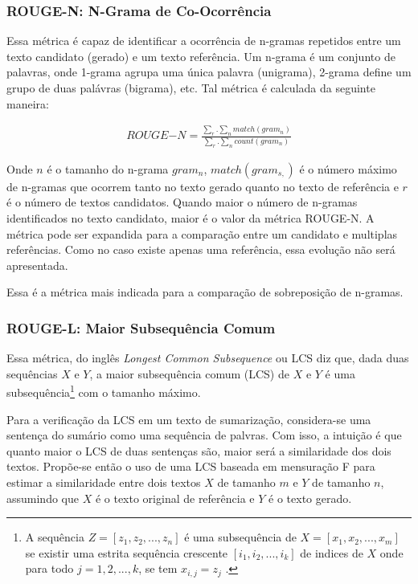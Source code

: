 \subsubsection{ROUGE-N: N-Grama de Co-Ocorrência}
Essa métrica é capaz de identificar a ocorrência de n-gramas repetidos entre um texto candidato (gerado) e um texto referência. Um n-grama é um conjunto de palavras, onde 1-grama agrupa uma única palavra (unigrama), 2-grama define um grupo de duas palávras (bigrama), etc. Tal métrica é calculada da seguinte maneira:

\begin{gather}
  ROUGE{-N} = \frac{\sum_{r} . \sum_{n} match(gram_{n})}
  {\sum_{r} . \sum_{n} count(gram_{n})}
\end{gather}

Onde $n$ é o tamanho do n-grama $gram_n$, $match(gram_{s,})$ é o número máximo de n-gramas que ocorrem tanto no texto gerado quanto no texto de referência e $r$ é o número de textos candidatos. Quando maior o número de n-gramas identificados no texto candidato, maior é o valor da métrica ROUGE-N. A métrica pode ser expandida para a comparação entre um candidato e multiplas referências. Como no caso existe apenas uma referência, essa evolução não será apresentada.

Essa é a métrica mais indicada para a comparação de sobreposição de n-gramas.

\subsubsection{ROUGE-L: Maior Subsequência Comum}

Essa métrica, do inglês \textit{Longest Common Subsequence} ou LCS diz que, dada duas sequências $X$ e $Y$, a maior subsequência comum (LCS) de $X$ e $Y$ é uma subsequência\footnote{
  A sequência \(Z = [z_1, z_2, ..., z_n]\) é uma
  subsequência de \(X = [x_1, x_2, ..., x_m]\) se existir uma estrita sequência crescente \([i_1, i_2, ..., i_k]\) de indices de $X$ onde para todo \(j = 1, 2, ..., k\), se tem \(x_{i,j} =  z_j\) \cite{intro-to-algorithms}.
} com o tamanho máximo.

Para a verificação da LCS em um texto de sumarização, considera-se uma sentença do sumário como uma sequência de palvras. Com isso, a intuição é que quanto maior o LCS de duas sentenças são, maior será a similaridade dos dois textos. Propõe-se então o uso de uma LCS baseada em mensuração F para estimar a similaridade entre dois textos $X$ de tamanho $m$ e $Y$ de tamanho $n$, assumindo que $X$ é o texto original de referência e $Y$ é o texto gerado.

